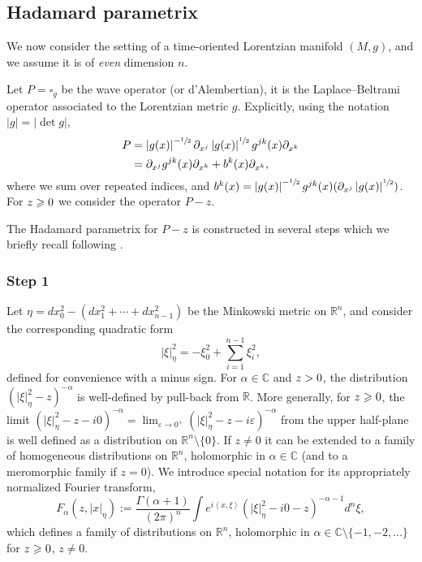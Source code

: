 \documentclass[JEP,XML,SOM,Unicode]{cedram}
\theoremstyle{definition}
\newcommand\rr{{\mathbb R}}
\newcommand\cc{{\mathbb C}}
\let\cv\alpha
\let\Im\relax
\DeclareMathOperator{\Im}{Im}
\newcommand*{\defeq}{:=}
\newcommand{\module}[1]{\left|#1\right|}
\def\s12{\sfrac{1}{2}}
\newcommand{\Fs}[2][\cv]{F_{#1}(#2,\vert x\vert_\eta)}
\begin{document}
\subsection{Hadamard parametrix} \label{s:hadamardformal}

We now consider the setting of a time-oriented Lorentzian manifold $(M,g)$, and we assume it is of \emph{even} dimension $n$.

Let $P=\square_g$ be the wave operator (or d'Alembertian), \ie it is the Laplace--Beltrami operator associated to the Lorentzian metric $g$. Explicitly, using the notation $\module{g}=\module{\det g}$,
\[
\begin{aligned}
P&=\module{g(x)}^{-\sfrac{1}{2}}\partial_{x^j} \module{g(x)}^{\sfrac{1}{2}}g^{jk}(x)\partial_{x^k} \\
& = \partial_{x^j}g^{jk}(x)\partial_{x^k}+b^k(x)\partial_{x^k},
\end{aligned}
\]
where we sum over repeated indices, and $b^k(x)=\module{g(x)}^{-\s12} g^{jk}(x)(\partial_{x^j}\module{g(x)}^{\sfrac{1}{2}})$. For $\Im z\geqslant 0$ we consider the operator $P-z$.

The Hadamard parametrix for $P-z$ is constructed in several steps which we briefly recall following \cite{Dang2020}.

\subsubsection*{Step 1} Let $\eta=dx_0^2-(dx_1^2+\cdots+dx_{n-1}^2)$ be the Minkowski metric on $\rr^n$, and consider the corresponding quadratic form
\[
\vert\xi\vert_\eta^2 = -\xi_0^2+\sum_{i=1}^{n-1}\xi_i^2,
\]
defined for convenience with a {minus} sign. For $\cv\in \cc$ and $\Im z >0$, the distribution $\left(\vert\xi\vert_\eta^2-z \right)^{-\cv}$ is well-defined by pull-back from $\rr$. More generally, for $\Im z \geqslant 0$, the limit $\left(\vert\xi\vert_\eta^2-z -i0\right)^{-\cv}=\lim_{\varepsilon\to 0^+}\left(\vert\xi\vert_\eta^2-z -i\varepsilon\right)^{-\cv}$ from the upper half-plane is well defined as a distribution on $\rr^n\setminus \{0\}$. If $z\neq 0$ it can be extended to a family of homogeneous distributions on $\rr^n$, holomorphic in $\cv\in \cc$ (and to a meromorphic family if $z=0$). We introduce special notation for its appropriately normalized Fourier transform,
\begin{equation}\label{eq:defFsz}
\Fs{z}\defeq\frac{\Gamma(\cv+1)}{(2\pi)^{n}} \int e^{i\left\langle x,\xi \right\rangle}\left(\vert\xi\vert_\eta^2-i0-z \right)^{-\cv-1}d^{n}\xi,
\end{equation}
which defines a family of distributions on $\rr^n$, holomorphic in $\cv\in\cc\setminus\{-1,-2,\dots\}$ for $\Im z\geqslant 0$, $z\neq 0$.
\end{document}
